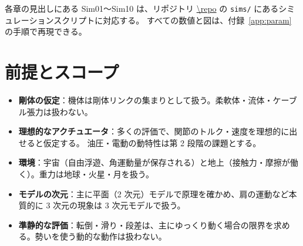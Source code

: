 各章の見出しにある Sim01〜Sim10 は、リポジトリ \url{\repo} の \texttt{sims/} にあるシミュレーションスクリプトに対応する。
すべての数値と図は、付録~\ref{app:param} の手順で再現できる。

\section{前提とスコープ}

\begin{itemize}
\item \textbf{剛体の仮定}：機体は剛体リンクの集まりとして扱う。柔軟体・流体・ケーブル張力は扱わない。
\item \textbf{理想的なアクチュエータ}：多くの評価で、関節のトルク・速度を理想的に出せると仮定する。
  油圧・電動の動特性は第 2 段階の課題とする。
\item \textbf{環境}：宇宙（自由浮遊、角運動量が保存される）と地上（接触力・摩擦が働く）。重力は地球・火星・月を扱う。
\item \textbf{モデルの次元}：主に平面（2 次元）モデルで原理を確かめ、肩の運動など本質的に 3 次元の現象は 3 次元モデルで扱う。
\item \textbf{準静的な評価}：転倒・滑り・段差は、主にゆっくり動く場合の限界を求める。勢いを使う動的な動作は扱わない。
\end{itemize}
